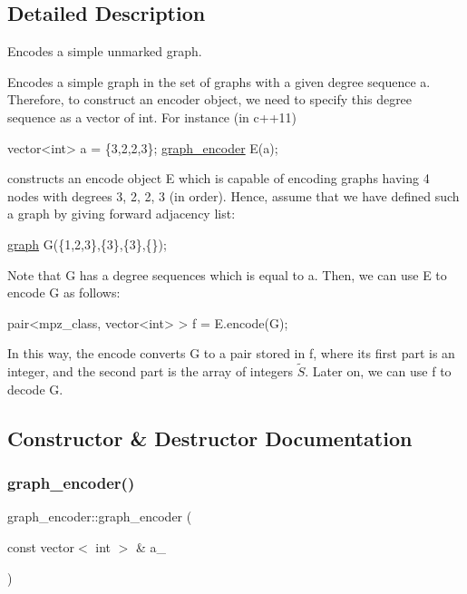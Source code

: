 \subsection{Detailed Description}
Encodes a simple unmarked graph. 

Encodes a simple graph in the set of graphs with a given degree sequence a. Therefore, to construct an encoder object, we need to specify this degree sequence as a vector of int. For instance (in c++11)


\begin{DoxyCode}
vector<int> a = \{3,2,2,3\};
\hyperlink{classgraph__encoder}{graph\_encoder} E(a);
\end{DoxyCode}


constructs an encode object E which is capable of encoding graphs having 4 nodes with degrees 3, 2, 2, 3 (in order). Hence, assume that we have defined such a graph by giving forward adjacency list\+:


\begin{DoxyCode}
\hyperlink{classgraph}{graph} G(\{1,2,3\},\{3\},\{3\},\{\});
\end{DoxyCode}


Note that G has a degree sequences which is equal to a. Then, we can use E to encode G as follows\+:


\begin{DoxyCode}
pair<mpz\_class, vector<int> > f = E.encode(G);
\end{DoxyCode}


In this way, the encode converts G to a pair stored in f, where its first part is an integer, and the second part is the array of integers $\tilde{S}$. Later on, we can use f to decode G. 

\subsection{Constructor \& Destructor Documentation}
\mbox{\label{classgraph__encoder_a571aefbf0b6ad203346fc4e0ef1a33dc}} 
\subsubsection{\texorpdfstring{graph\+\_\+encoder()}{graph\_encoder()}}
{\footnotesize\ttfamily graph\+\_\+encoder\+::graph\+\_\+encoder (\begin{DoxyParamCaption}\item[{const vector$<$ int $>$ \&}]{a\+\_\+ }\end{DoxyParamCaption})}



